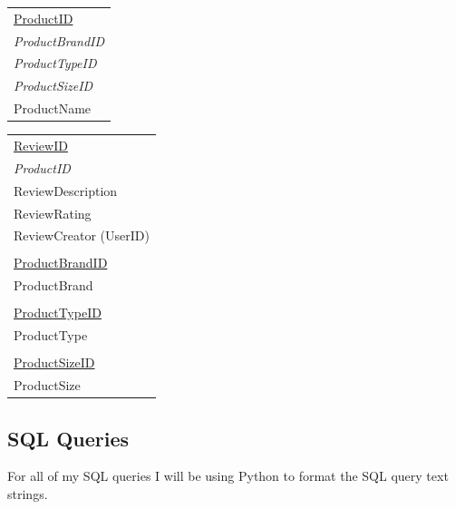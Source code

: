 \begin{center}
\begin{tabular}{|p{4cm}|}
\underline{ProductID} \\

\emph{ProductBrandID} \\
\emph{ProductTypeID} \\
\emph{ProductSizeID} \\ 
ProductName \\ \hline










\end{tabular}
\label{tab:3NF User Database}
\end{center}


\begin{center}
\begin{tabular}{|p{4cm}|} \hline 


\underline{ReviewID} \\
\emph{ProductID} \\ 
ReviewDescription \\
ReviewRating \\ 

ReviewCreator (UserID) \\ \hline
\\ \hline 


\underline{ProductBrandID} \\
ProductBrand \\ \hline
\\ \hline 

\underline{ProductTypeID} \\
ProductType \\ \hline
\\ \hline 

\underline{ProductSizeID} \\
ProductSize \\ \hline



\end{tabular}
\label{tab:3NF User Database}
\end{center}


\subsection{SQL Queries}

For all of my SQL queries I will be using Python to format the SQL query text strings. 




